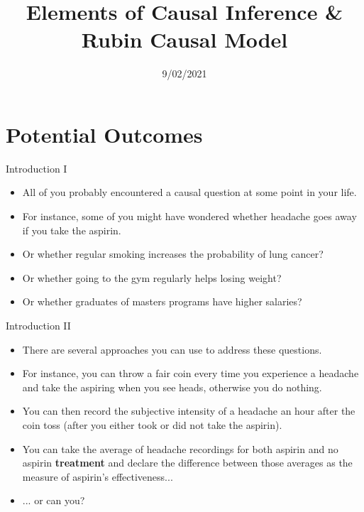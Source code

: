 \documentclass{beamer}
\title[]{\textbf{\Large{Elements of Causal Inference \& Rubin Causal Model}}}
\author[]{%
  \texorpdfstring{%
    \begin{columns}
      \column{.3333\linewidth}
      \centering
      \large{}
      \column{.40\linewidth}
      \centering
      \large{Evgeny Sedashov, PhD} \\
      \small{esedashov@hse.ru}
      \column{.3333\linewidth}
      \centering
      \large{}
    \end{columns}
 }
 {Author 1, Author 2, Author 3}
}
\date{9/02/2021}
\begin{document}
 
\makeatletter
\let\beamer@old@writeslidentry\beamer@writeslidentry
\newcommand\bulletoff{\let\beamer@writeslidentry\relax}
\newcommand\bulleton{\let\beamer@writeslidentry\beamer@old@writeslidentry}
\large
\begin{frame}[plain]
\titlepage 
\end{frame}
\section{Potential Outcomes}
\begin{frame}{Introduction I}
	\begin{itemize}
	\setlength\itemsep{1em}
	\item All of you probably encountered a causal question at some point in your life.
	\item For instance, some of you might have wondered whether headache goes away if you take the aspirin.
	\item Or whether regular smoking increases the probability of lung cancer?
	\item Or whether going to the gym regularly helps losing weight?
	\item Or whether graduates of masters programs have higher salaries?
\end{itemize}
\end{frame}
\begin{frame}{Introduction II}
	\begin{itemize}
	\item There are several approaches you can use to address these questions.
	\item For instance, you can throw a fair coin every time you experience a headache and take the aspiring when you see heads, otherwise you do nothing.
	\item You can then record the subjective intensity of a headache an hour after the coin toss (after you either took or did not take the aspirin).
	\item You can take the average of headache recordings for both aspirin and no aspirin \textbf{treatment} and declare the difference between those averages as the measure of aspirin's effectiveness...
	\item ... or can you? 
	\end{itemize}
\end{frame}
\end{document}
